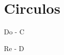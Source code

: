 \section{Circulos}
\label{sec:circulos}

\noindent
Do - C \hspace{1cm}
\chordC
\chordAm
\chordDm
\chordGs

\vspace{1cm}

\noindent
Re - D \hspace{1cm}
\chordD
\chordBm
\chordEm
\chordAs



